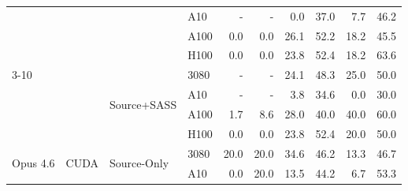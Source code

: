 \begin{tabular}{@{}llllrrrrrr@{}}
 &  &  & A10 & \cellcolor[rgb]{1.000,1.000,1.000}- & \cellcolor[rgb]{1.000,1.000,1.000}- & \cellcolor[rgb]{1.000,1.000,1.000}0.0 & \cellcolor[rgb]{1.000,0.796,0.796}37.0 & \cellcolor[rgb]{1.000,0.983,0.983}7.7 & \cellcolor[rgb]{1.000,0.709,0.709}46.2 \\
 &  &  & A100 & \cellcolor[rgb]{1.000,1.000,1.000}0.0 & \cellcolor[rgb]{1.000,1.000,1.000}0.0 & \cellcolor[rgb]{1.000,0.883,0.883}26.1 & \cellcolor[rgb]{1.000,0.647,0.647}52.2 & \cellcolor[rgb]{1.000,0.935,0.935}18.2 & \cellcolor[rgb]{1.000,0.716,0.716}45.5 \\
 &  &  & H100 & \cellcolor[rgb]{1.000,1.000,1.000}0.0 & \cellcolor[rgb]{1.000,1.000,1.000}0.0 & \cellcolor[rgb]{1.000,0.899,0.899}23.8 & \cellcolor[rgb]{1.000,0.644,0.644}52.4 & \cellcolor[rgb]{1.000,0.935,0.935}18.2 & \cellcolor[rgb]{1.000,0.515,0.515}63.6 \\
\cmidrule(lr){3-10}
 &  & \multirow{4}{*}{Source+SASS} & 3080 & \cellcolor[rgb]{1.000,1.000,1.000}- & \cellcolor[rgb]{1.000,1.000,1.000}- & \cellcolor[rgb]{1.000,0.897,0.897}24.1 & \cellcolor[rgb]{1.000,0.688,0.688}48.3 & \cellcolor[rgb]{1.000,0.891,0.891}25.0 & \cellcolor[rgb]{1.000,0.670,0.670}50.0 \\
 &  &  & A10 & \cellcolor[rgb]{1.000,1.000,1.000}- & \cellcolor[rgb]{1.000,1.000,1.000}- & \cellcolor[rgb]{1.000,0.995,0.995}3.8 & \cellcolor[rgb]{1.000,0.817,0.817}34.6 & \cellcolor[rgb]{1.000,1.000,1.000}0.0 & \cellcolor[rgb]{1.000,0.854,0.854}30.0 \\
 &  &  & A100 & \cellcolor[rgb]{1.000,0.999,0.999}1.7 & \cellcolor[rgb]{1.000,0.980,0.980}8.6 & \cellcolor[rgb]{1.000,0.870,0.870}28.0 & \cellcolor[rgb]{1.000,0.769,0.769}40.0 & \cellcolor[rgb]{1.000,0.769,0.769}40.0 & \cellcolor[rgb]{1.000,0.558,0.558}60.0 \\
 &  &  & H100 & \cellcolor[rgb]{1.000,1.000,1.000}0.0 & \cellcolor[rgb]{1.000,1.000,1.000}0.0 & \cellcolor[rgb]{1.000,0.899,0.899}23.8 & \cellcolor[rgb]{1.000,0.644,0.644}52.4 & \cellcolor[rgb]{1.000,0.924,0.924}20.0 & \cellcolor[rgb]{1.000,0.670,0.670}50.0 \\
\midrule
\multirow{16}{*}{Opus 4.6} & \multirow{8}{*}{CUDA} & \multirow{4}{*}{Source-Only} & 3080 & \cellcolor[rgb]{1.000,0.924,0.924}20.0 & \cellcolor[rgb]{1.000,0.924,0.924}20.0 & \cellcolor[rgb]{1.000,0.817,0.817}34.6 & \cellcolor[rgb]{1.000,0.709,0.709}46.2 & \cellcolor[rgb]{1.000,0.960,0.960}13.3 & \cellcolor[rgb]{1.000,0.704,0.704}46.7 \\
 &  &  & A10 & \cellcolor[rgb]{1.000,1.000,1.000}0.0 & \cellcolor[rgb]{1.000,0.924,0.924}20.0 & \cellcolor[rgb]{1.000,0.959,0.959}13.5 & \cellcolor[rgb]{1.000,0.729,0.729}44.2 & \cellcolor[rgb]{1.000,0.987,0.987}6.7 & \cellcolor[rgb]{1.000,0.635,0.635}53.3 \\

\end{tabular}

